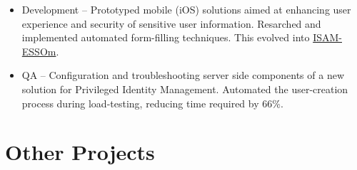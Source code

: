 \begin{itemize}
  \begin{itemize}
  \tightlist
  \item
    Development -- Prototyped mobile (iOS) solutions aimed at enhancing
    user experience and security of sensitive user information.
    Resarched and implemented automated form-filling techniques. This
    evolved into
    \href{https://itunes.apple.com/us/app/isam-essom/id741972716?mt=8}{ISAM-ESSOm}.
  \item
    QA -- Configuration and troubleshooting server side components of a
    new solution for Privileged Identity Management. Automated the
    user-creation process during load-testing, reducing time required by
    66\%.
  \end{itemize}
\end{itemize}

\section{Other Projects}\label{other-projects}

